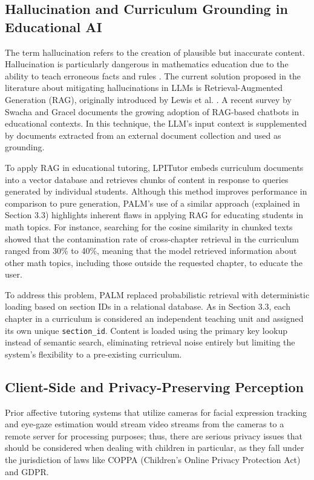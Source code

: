\documentclass[conference, letterpaper]{IEEEtran}
\begin{document}
\subsection{Hallucination and Curriculum Grounding in Educational AI}

The term hallucination refers to the creation of plausible but inaccurate content. Hallucination is particularly dangerous in mathematics education due to the ability to teach erroneous facts and rules \cite{cobbe2021}. The current solution proposed in the literature about mitigating hallucinations in LLMs is Retrieval-Augmented Generation (RAG), originally introduced by Lewis et al. \cite{lewis2020}. A recent survey by Swacha and Gracel \cite{swacha2025} documents the growing adoption of RAG-based chatbots in educational contexts. In this technique, the LLM's input context is supplemented by documents extracted from an external document collection and used as grounding.

To apply RAG in educational tutoring, LPITutor \cite{lpitutor2025} embeds curriculum documents into a vector database and retrieves chunks of content in response to queries generated by individual students. Although this method improves performance in comparison to pure generation, PALM's use of a similar approach (explained in Section 3.3) highlights inherent flaws in applying RAG for educating students in math topics. For instance, searching for the cosine similarity in chunked texts showed that the contamination rate of cross-chapter retrieval in the curriculum ranged from 30\% to 40\%, meaning that the model retrieved information about other math topics, including those outside the requested chapter, to educate the user.


To address this problem, PALM replaced probabilistic retrieval with deterministic loading based on section IDs in a relational database. As in Section 3.3, each chapter in a curriculum is considered an independent teaching unit and assigned its own unique \texttt{section\_id}. Content is loaded using the primary key lookup instead of semantic search, eliminating retrieval noise entirely but limiting the system's flexibility to a pre-existing curriculum.

\subsection{Client-Side and Privacy-Preserving Perception}

Prior affective tutoring systems that utilize cameras for facial expression tracking and eye-gaze estimation would stream video streams from the cameras to a remote server for processing purposes; thus, there are serious privacy issues that should be considered when dealing with children in particular, as they fall under the jurisdiction of laws like COPPA (Children’s Online Privacy Protection Act) and GDPR.
\end{document}
